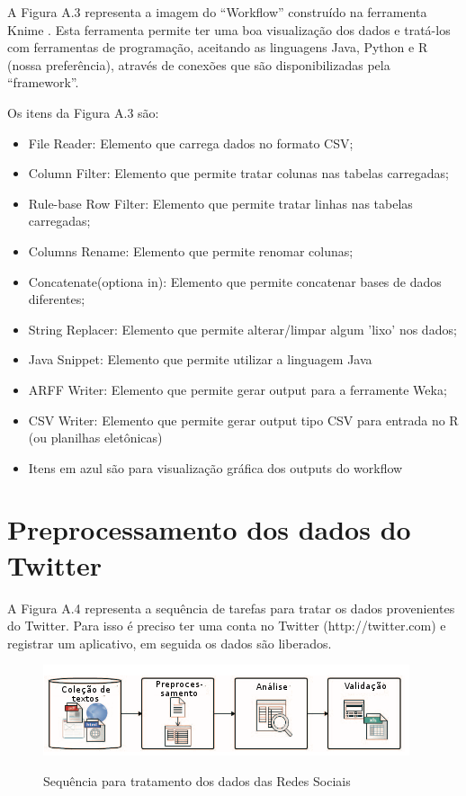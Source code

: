 A Figura A.3 representa a imagem do ``Workflow'' construído na ferramenta Knime \cite{Knime2}.
Esta ferramenta permite ter uma boa visualização dos dados e tratá-los com ferramentas de programação, aceitando as linguagens Java, Python e R (nossa preferência), através de conexões que são disponibilizadas pela ``framework''.

Os itens da Figura A.3 são:
\begin{itemize}
	\item File Reader: Elemento que carrega dados no formato CSV;
	\item Column Filter: Elemento que permite tratar colunas nas tabelas carregadas;
	\item Rule-base Row Filter: Elemento que permite tratar linhas nas tabelas carregadas;
	\item Columns Rename: Elemento que permite renomar colunas;
	\item Concatenate(optiona in): Elemento que permite concatenar bases de dados diferentes;
	\item String Replacer: Elemento que permite alterar/limpar algum 'lixo' nos dados;
	\item Java Snippet: Elemento que permite utilizar a linguagem Java
	\item ARFF Writer: Elemento que permite gerar output para a ferramente Weka;
	\item CSV Writer:  Elemento que permite gerar output tipo CSV para entrada no R (ou planilhas eletônicas)
	\item Itens em azul são para visualização gráfica dos outputs do workflow
\end{itemize}



\pagebreak

\section{Preprocessamento dos dados do Twitter}\label{intro:Anexo}

A Figura A.4 representa a sequência de tarefas para tratar os dados provenientes do Twitter. Para isso é preciso ter uma conta no Twitter (http://twitter.com) e registrar  um aplicativo, em seguida os dados são liberados.
\begin{figure}[ht!]
	\centering
\caption{Sequência para tratamento dos dados das Redes Sociais}
	\includegraphics[width=0.7\linewidth]{Figuras/Twitter/prepocesTextos}
	\label{fig:workflow Twitter}
\end{figure}

